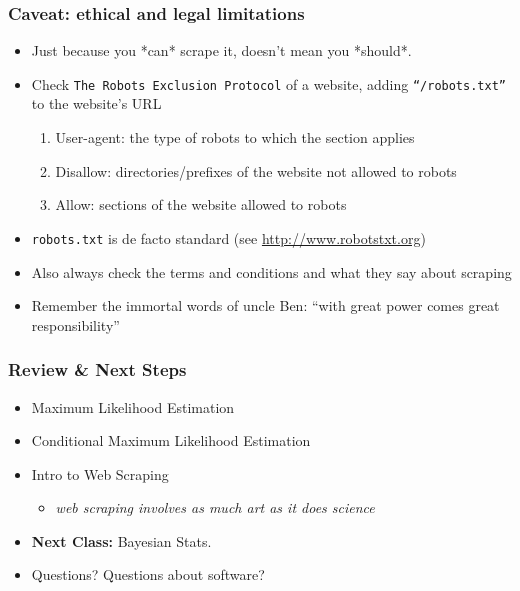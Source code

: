 \documentclass[
  shownotes,
  xcolor={svgnames},
  hyperref={colorlinks,citecolor=DarkBlue,linkcolor=DarkRed,urlcolor=DarkBlue}
  , aspectratio=169]{beamer}
\begin{document}
\begin{frame}
\frametitle{Caveat: ethical and legal limitations}

\begin{itemize}
\item Just because you *can* scrape it, doesn't mean you *should*. 
\medskip
\item Check \texttt{The Robots Exclusion Protocol} of a website, adding \texttt{``/robots.txt''} to the website's URL
\begin{enumerate}
  \item User-agent:  the type of robots to which the section applies
  \item Disallow:  directories/prefixes of the website not allowed to robots
  \item Allow:  sections of the website allowed to robots
\end{enumerate}
\medskip
\item \texttt{robots.txt} is de facto standard (see \url{http://www.robotstxt.org})
\medskip
\item Also always check the terms and conditions and what they say about scraping
\medskip
\item Remember the immortal words of uncle Ben: ``with great power comes great responsibility''

\end{itemize}


\end{frame}


\begin{frame}
\frametitle{Review \& Next Steps}
  
  \begin{itemize} 
    \item Maximum Likelihood Estimation
    \medskip
    \item Conditional Maximum Likelihood Estimation
    \medskip
    \item Intro to Web Scraping
    \begin{itemize} 
    \item {\it web scraping involves as much art as it does science}
    \end{itemize} 
  \bigskip  

  
  \item  {\bf Next Class:} Bayesian Stats.
  \bigskip
  \item Questions? Questions about software? 
  
  \end{itemize}


\end{frame}
\end{document}
